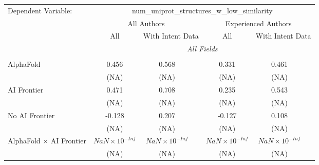 \begingroup
\centering
\begin{tabular}{lcccccc}
   \tabularnewline \midrule \midrule
   Dependent Variable: & \multicolumn{6}{c}{num\_uniprot\_structures\_w\_low\_similarity}\\
 & \multicolumn{3}{c}{All Authors} & \multicolumn{3}{c}{Experienced Authors} \\
\cmidrule(lr){2-4} \cmidrule(lr){5-7}
 & \multicolumn{1}{c}{All} & \multicolumn{2}{c}{With Intent Data} & \multicolumn{1}{c}{All} & \multicolumn{2}{c}{With Intent Data} \\
\cmidrule(lr){2-2} \cmidrule(lr){3-4} \cmidrule(lr){5-5} \cmidrule(lr){6-7}
 & \multicolumn{6}{c}{\textit{All Fields}} \\ \\
   AlphaFold                                                                  & 0.456                  & 0.568                  &                        & 0.331                  & 0.461                  &   \\   
                                                                              & (NA)                   & (NA)                   &                        & (NA)                   & (NA)                   &   \\   
   AI Frontier                                                                & 0.471                  & 0.708                  &                        & 0.235                  & 0.543                  &   \\   
                                                                              & (NA)                   & (NA)                   &                        & (NA)                   & (NA)                   &   \\   
   No AI Frontier                                                             & -0.128                 & 0.207                  &                        & -0.127                 & 0.108                  &   \\   
                                                                              & (NA)                   & (NA)                   &                        & (NA)                   & (NA)                   &   \\   
   AlphaFold $\times$ AI Frontier                                             & $NaN\times 10^{-Inf}$  & $NaN\times 10^{-Inf}$  &                        & $NaN\times 10^{-Inf}$  & $NaN\times 10^{-Inf}$  &   \\   
                                                                              & (NA)                   & (NA)                   &                        & (NA)                   & (NA)                   &   \\   

\end{tabular}
